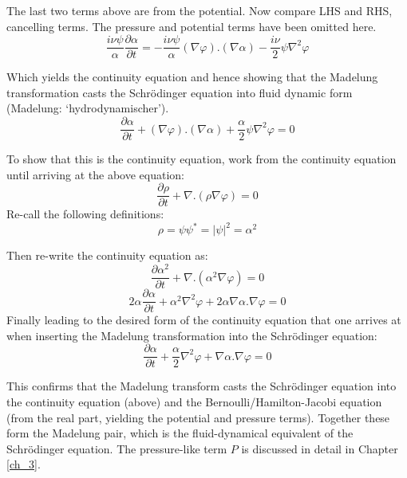 \noindent The last two terms above are from the potential. Now compare LHS and RHS, cancelling terms. The pressure and potential terms have been omitted here.
\begin{equation}
\frac{i\nu\psi}{\alpha}\frac{\partial\alpha}{\partial t} = -\frac{i\nu\psi}{\alpha}(\nabla\varphi).(\nabla\alpha)-\frac{i\nu}{2}\psi\nabla^2\varphi
\end{equation}

\noindent Which yields the continuity equation and hence showing that the Madelung transformation casts the Schr\"odinger equation into fluid dynamic form (Madelung: `hydrodynamischer').
\begin{equation}
\frac{\partial\alpha}{\partial t} +(\nabla\varphi).(\nabla\alpha)+\frac{\alpha}{2}\psi\nabla^2\varphi = 0
\end{equation}

\noindent To show that this is the continuity equation, work from the continuity equation until arriving at the above equation:
\begin{equation}
\frac{\partial\rho}{\partial t} +\nabla.(\rho\nabla\varphi) = 0
\end{equation}
\noindent Re-call the following definitions:
\begin{equation}
\rho = \psi\psi^* = |\psi|^2 = \alpha^2
\end{equation}

\noindent Then re-write the continuity equation as:
\begin{equation}
\frac{\partial\alpha^2}{\partial t} + \nabla . (\alpha^2\nabla\varphi)= 0
\end{equation}
\begin{equation}
2\alpha\frac{\partial\alpha}{\partial t} + \alpha^2\nabla^2\varphi + 2\alpha\nabla\alpha.\nabla\varphi = 0
\end{equation}
\noindent Finally leading to the desired form of the continuity equation that one arrives at when inserting the Madelung transformation into the Schr\"odinger equation:
\begin{equation}
\frac{\partial\alpha}{\partial t} + \frac{\alpha}{2}\nabla^2\varphi + \nabla\alpha.\nabla\varphi = 0
\end{equation}

\noindent This confirms that the Madelung transform casts the Schr\"odinger equation into the continuity equation (above) and the Bernoulli/Hamilton-Jacobi equation (from the real part, yielding the potential and pressure terms). Together these form the Madelung pair, which is the fluid-dynamical equivalent of the Schr\"odinger equation. The pressure-like term $P$ is discussed in detail in Chapter \ref{ch_3}.

